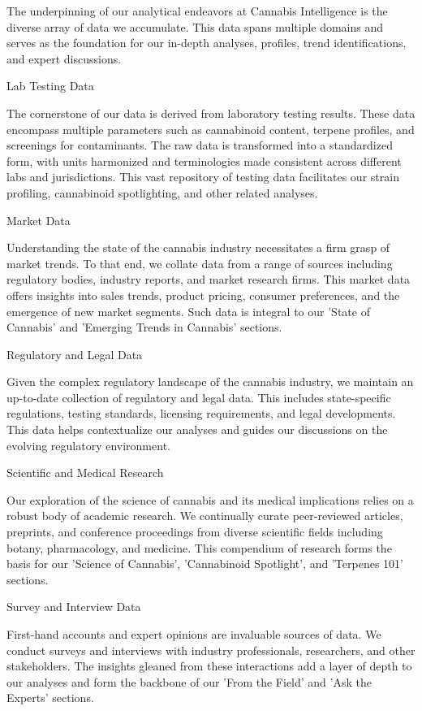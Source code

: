 \documentclass[../article.tex, 12pt]{subfiles}
\begin{document}
\begin{multicols*}{2}
The underpinning of our analytical endeavors at Cannabis Intelligence is the diverse array of data we accumulate. This data spans multiple domains and serves as the foundation for our in-depth analyses, profiles, trend identifications, and expert discussions.

Lab Testing Data

The cornerstone of our data is derived from laboratory testing results. These data encompass multiple parameters such as cannabinoid content, terpene profiles, and screenings for contaminants. The raw data is transformed into a standardized form, with units harmonized and terminologies made consistent across different labs and jurisdictions. This vast repository of testing data facilitates our strain profiling, cannabinoid spotlighting, and other related analyses.

Market Data

Understanding the state of the cannabis industry necessitates a firm grasp of market trends. To that end, we collate data from a range of sources including regulatory bodies, industry reports, and market research firms. This market data offers insights into sales trends, product pricing, consumer preferences, and the emergence of new market segments. Such data is integral to our 'State of Cannabis' and 'Emerging Trends in Cannabis' sections.

Regulatory and Legal Data

Given the complex regulatory landscape of the cannabis industry, we maintain an up-to-date collection of regulatory and legal data. This includes state-specific regulations, testing standards, licensing requirements, and legal developments. This data helps contextualize our analyses and guides our discussions on the evolving regulatory environment.

Scientific and Medical Research

Our exploration of the science of cannabis and its medical implications relies on a robust body of academic research. We continually curate peer-reviewed articles, preprints, and conference proceedings from diverse scientific fields including botany, pharmacology, and medicine. This compendium of research forms the basis for our 'Science of Cannabis', 'Cannabinoid Spotlight', and 'Terpenes 101' sections.

Survey and Interview Data

First-hand accounts and expert opinions are invaluable sources of data. We conduct surveys and interviews with industry professionals, researchers, and other stakeholders. The insights gleaned from these interactions add a layer of depth to our analyses and form the backbone of our 'From the Field' and 'Ask the Experts' sections.


\end{multicols*}
\end{document}
